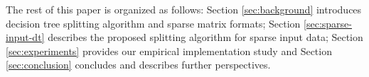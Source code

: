 The rest of this paper is organized as follows: Section \ref{sec:background}
introduces decision tree splitting algorithm and sparse matrix formats; Section
\ref{sec:sparse-input-dt} describes the proposed splitting algorithm for sparse
input data; Section \ref{sec:experiments} provides our empirical implementation
study and Section \ref{sec:conclusion} concludes and describes further
perspectives.


